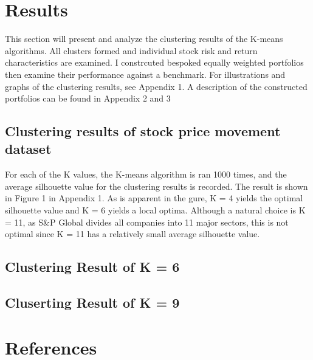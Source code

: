 \documentclass[11pt,preprint, authoryear]{elsarticle}
\numberwithin{equation}{section}
\numberwithin{figure}{section}
\numberwithin{table}{section}
\begin{document}
\newpage

\hypertarget{results}{%
\section{\texorpdfstring{Results
\label{Results}}{Results }}\label{results}}

This section will present and analyze the clustering results of the
K-means algorithms. All clusters formed and individual stock risk and
return characteristics are examined. I constrcuted bespoked equally
weighted portfolios then examine their performance against a benchmark.
For illustrations and graphs of the clustering results, see Appendix 1.
A description of the constructed portfolios can be found in Appendix 2
and 3

\hypertarget{clustering-results-of-stock-price-movement-dataset}{%
\subsection{Clustering results of stock price movement
dataset}\label{clustering-results-of-stock-price-movement-dataset}}

For each of the K values, the K-means algorithm is ran 1000 times, and
the average silhouette value for the clustering results is recorded. The
result is shown in Figure 1 in Appendix 1. As is apparent in the gure, K
= 4 yields the optimal silhouette value and K = 6 yields a local optima.
Although a natural choice is K = 11, as S\&P Global divides all
companies into 11 major sectors, this is not optimal since K = 11 has a
relatively small average silhouette value.

\hypertarget{clustering-result-of-k-6}{%
\subsection{Clustering Result of K = 6}\label{clustering-result-of-k-6}}

\hypertarget{cluserting-result-of-k-9}{%
\subsection{Cluserting Result of K = 9}\label{cluserting-result-of-k-9}}

\newpage

\hypertarget{references}{%
\section{References}\label{references}}
\end{document}
